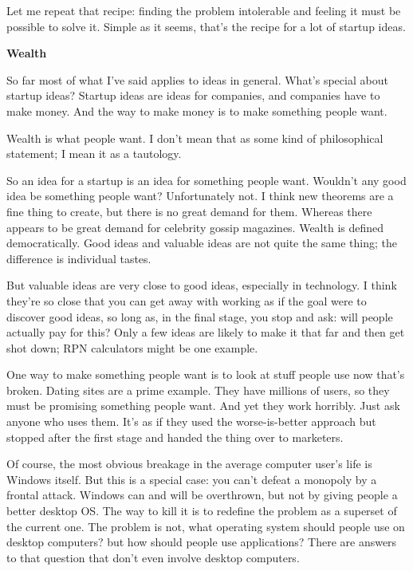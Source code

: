 Let me repeat that recipe: finding the problem
                    intolerable and feeling it must be possible to solve it.
                    Simple as it seems, that's the recipe for a lot of startup
                    ideas.

\textbf{Wealth}

So far most of
                    what I've said applies to ideas in general. What's special
                    about startup ideas? Startup ideas are ideas for companies,
                    and companies have to make money. And the way to make money
                    is to make something people want.

Wealth is what
                    people want. I don't mean that as some kind of philosophical
                    statement; I mean it as a tautology.

So an idea
                    for a startup is an idea for something people want. Wouldn't
                    any good idea be something people want? Unfortunately not. I
                    think new theorems are a fine thing to create, but there is
                    no great demand for them. Whereas there appears to be great
                    demand for celebrity gossip magazines. Wealth is defined
                    democratically. Good ideas and valuable ideas are not quite
                    the same thing; the difference is individual tastes.

But
                    valuable ideas are very close to good ideas, especially in
                    technology. I think they're so close that you can get away
                    with working as if the goal were to discover good ideas, so
                    long as, in the final stage, you stop and ask: will people
                    actually pay for this? Only a few ideas are likely to make
                    it that far and then get shot down; RPN calculators might be
                    one example.

One way to make something people
                    want is to look at stuff people use now that's broken.
                    Dating sites are a prime example. They have millions of
                    users, so they must be promising something people want. And
                    yet they work horribly. Just ask anyone who uses them. It's
                    as if they used the worse-is-better approach but stopped
                    after the first stage and handed the thing over to
                    marketers.

Of course, the most obvious breakage
                    in the average computer user's life is Windows itself. But
                    this is a special case: you can't defeat a monopoly by a
                    frontal attack. Windows can and will be overthrown, but not
                    by giving people a better desktop OS. The way to kill it is
                    to redefine the problem as a superset of the current one.
                    The problem is not, what operating system should people use
                    on desktop computers? but how should people use
                    applications? There are answers to that question that don't
                    even involve desktop computers.

